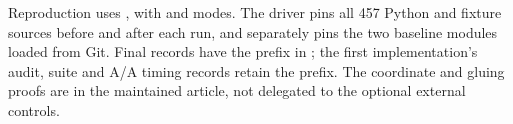 

Reproduction uses , with
 and  modes. The driver pins all 457 Python and
fixture sources before and after each run, and separately pins the two
baseline modules loaded from Git. Final records have the
 prefix in ; the first implementation's
audit, suite and A/A timing records retain the
 prefix. The coordinate and gluing proofs are
in the maintained article, not delegated to the optional external controls.
